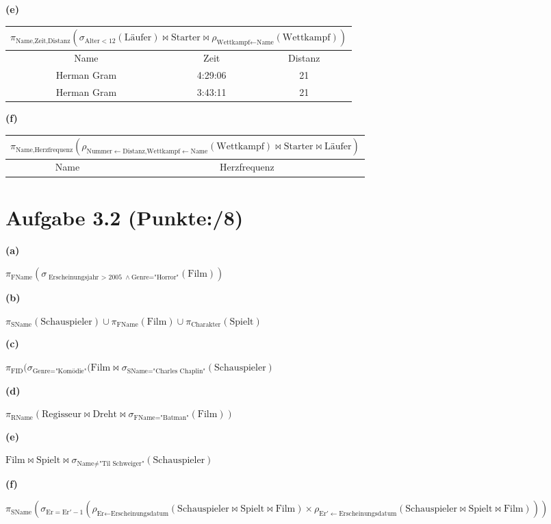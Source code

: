 \documentclass[11pt, a4paper]{article}
\newcommand{\blattnummer}{3}
\newcommand{\pp}{8}
\newcommand{\aufgabe}[2] {\section*{Aufgabe \blattnummer.#1 (Punkte:\qquad/#2)}}
\newcommand{\aufgabenteil}[1] {\textbf{(#1)}}
\begin{document}
\aufgabenteil{e}
\begin{adjustwidth}{20pt}{20pt}
\begin{tabular}{|c c c|}\hline
\multicolumn{3}{|c|}{$\pi_{\text{Name,Zeit,Distanz}}(\sigma_{\text{Alter}<12}(\text{Läufer})\bowtie\text{Starter}\bowtie\rho_{\text{Wettkampf$\leftarrow$Name}}(\text{Wettkampf}))$} \\\hline
Name & Zeit & Distanz \\\hline
Herman Gram & 4:29:06 & 21 \\
Herman Gram & 3:43:11 & 21 \\\hline
\end{tabular}
\end{adjustwidth}
\aufgabenteil{f}
\begin{adjustwidth}{20pt}{20pt}
\begin{tabular}{|c c|}\hline
\multicolumn{2}{|c|}{$\pi_{\text{Name,Herzfrequenz}}(\rho_{\text{Nummer$\leftarrow$Distanz,Wettkampf$\leftarrow$Name}}(\text{Wettkampf})\bowtie\text{Starter}\bowtie\text{Läufer})$} \\\hline
Name & Herzfrequenz \\\hline
\end{tabular}
\end{adjustwidth}


\aufgabe{2}{\pp}
\aufgabenteil{a}
\begin{adjustwidth}{20pt}{20pt}
$\pi_{\text{FName}}(\sigma_{\text{Erscheinungsjahr $>$ 2005} \wedge \text{Genre="Horror"} }(\text{Film}))$ 
\end{adjustwidth}
\aufgabenteil{b}
\begin{adjustwidth}{20pt}{20pt}
$\pi_{\text{SName}}(\text{Schauspieler}) \cup \pi_{\text{FName}}(\text{Film}) \cup \pi_{\text{Charakter}}(\text{Spielt})$
\end{adjustwidth}
\aufgabenteil{c}
\begin{adjustwidth}{20pt}{20pt}
$\pi_{\text{FID}}(\sigma_{\text{Genre="Komödie"} }(\text{Film} \bowtie \sigma_{\text{SName="Charles Chaplin"}}(\text{Schauspieler})$
\end{adjustwidth}
\aufgabenteil{d}
\begin{adjustwidth}{20pt}{20pt}
$\pi_{\text{RName}}(\text{Regisseur} \bowtie \text{Dreht} \bowtie \sigma_{\text{FName="Batman"}}(\text{Film}))$
\end{adjustwidth}
\aufgabenteil{e}
\begin{adjustwidth}{20pt}{20pt}
$\text{Film} \bowtie \text{Spielt} \bowtie \sigma_{\text{Name} \neq \text{"Til Schweiger"}}(\text{Schauspieler})$
\end{adjustwidth}
\aufgabenteil{f}
\begin{adjustwidth}{20pt}{20pt}
$\pi_{\text{SName}}(\sigma_{\text{Er} = \text{Er}\prime - 1}(\rho_{\text{Er} \leftarrow \text{Erscheinungsdatum}}(\text{Schauspieler} \bowtie \text{Spielt} \bowtie \text{Film}) \times \rho_{\text{Er}\prime \leftarrow \text{Erscheinungsdatum}}(\text{Schauspieler} \bowtie \text{Spielt} \bowtie \text{Film})))$
\end{adjustwidth}
\end{document}
